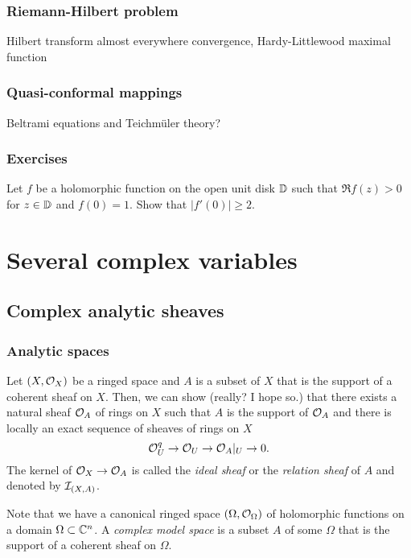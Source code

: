 \documentclass{../../large}
\begin{document}
\section{Riemann-Hilbert problem}
Hilbert transform
almost everywhere convergence, Hardy-Littlewood maximal function

\section{Quasi-conformal mappings}
Beltrami equations and Teichm\"uler theory?

\section{Exercises}
\begin{prb}
Let $f$ be a holomorphic function on the open unit disk $\mathbb{D}$ such that $\Re f(z)>0$ for $z\in\mathbb{D}$ and $f(0)=1$. Show that $|f'(0)|\ge2$.
\end{prb}






\chapter{}






\part{Several complex variables}

\chapter{Complex analytic sheaves}


\section{Analytic spaces}

\begin{prb}

Let $(X,\mathcal{O}_X)$ be a ringed space and $A$ is a subset of $X$ that is the support of a coherent sheaf on $X$.
Then, we can show (really? I hope so.) that there exists a natural sheaf $\mathcal{O}_A$ of rings on $X$ such that $A$ is the support of $\mathcal{O}_A$ and there is locally an exact sequence of sheaves of rings on $X$
\[\mathcal{O}_U^q\to\mathcal{O}_U\to\mathcal{O}_A|_U\to0.\]
The kernel of $\mathcal{O}_X\to\mathcal{O}_A$ is called the \emph{ideal sheaf} or the \emph{relation sheaf} of $A$ and denoted by $\mathcal{I}_{(X,A)}$.

Note that we have a canonical ringed space $(\Omega,\mathcal{O}_\Omega)$ of holomorphic functions on a domain $\Omega\subset\mathbb{C}^n$.
A \emph{complex model space} is a subset $A$ of some $\Omega$ that is the support of a coherent sheaf on $\Omega$.
\end{prb}
\begin{pf}

\end{pf}
\end{document}
